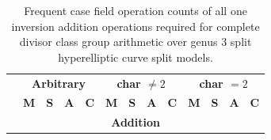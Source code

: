 \begin{table}[htbp]
\caption{Frequent case field operation counts of all one inversion addition
operations required for complete divisor class group arithmetic over genus 3
split hyperelliptic curve split models.}
\label{tab:g3splitfcostsADD}
\centering
\begin{tabular}{|l|cccc|cccc|cccc|}
\hline
&\multicolumn{4}{c|}{\textbf{Arbitrary}}
&\multicolumn{4}{c|}{\textbf{char $\not = 2$}}
&\multicolumn{4}{c|}{\textbf{char $= 2$}}\TS\\

\centering{\textbf{Operations}}
&\textbf{M}&\textbf{S}&\textbf{A}&\textbf{C}
&\textbf{M}&\textbf{S}&\textbf{A}&\textbf{C}
&\textbf{M}&\textbf{S}&\textbf{A}&\textbf{C}\\
\hline
\multicolumn{13}{|c|}{\textbf{Addition}} \TS\\
\hline


\end{tabular}
\end{table}
